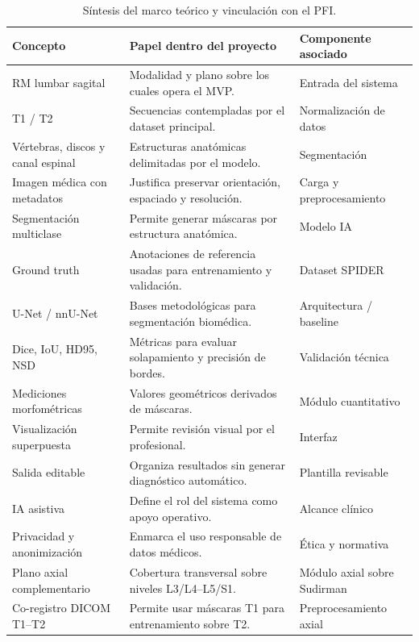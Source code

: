 \begin{table}[htbp]
\centering
\caption{Síntesis del marco teórico y vinculación con el PFI.}
\label{tab:sintesis_marco_teorico_pfi}
\small
\begin{tabularx}{\textwidth}{p{} X p{}}
\hline
\textbf{Concepto} & \textbf{Papel dentro del proyecto} & \textbf{Componente asociado} \\
\hline
RM lumbar sagital & Modalidad y plano sobre los cuales opera el MVP. & Entrada del sistema \\
T1 / T2 & Secuencias contempladas por el dataset principal. & Normalización de datos \\
Vértebras, discos y canal espinal & Estructuras anatómicas delimitadas por el modelo. & Segmentación \\
Imagen médica con metadatos & Justifica preservar orientación, espaciado y resolución. & Carga y preprocesamiento \\
Segmentación multiclase & Permite generar máscaras por estructura anatómica. & Modelo IA \\
Ground truth & Anotaciones de referencia usadas para entrenamiento y validación. & Dataset SPIDER \\
U-Net / nnU-Net & Bases metodológicas para segmentación biomédica. & Arquitectura / baseline \\
Dice, IoU, HD95, NSD & Métricas para evaluar solapamiento y precisión de bordes. & Validación técnica \\
Mediciones morfométricas & Valores geométricos derivados de máscaras. & Módulo cuantitativo \\
Visualización superpuesta & Permite revisión visual por el profesional. & Interfaz \\
Salida editable & Organiza resultados sin generar diagnóstico automático. & Plantilla revisable \\
IA asistiva & Define el rol del sistema como apoyo operativo. & Alcance clínico \\
Privacidad y anonimización & Enmarca el uso responsable de datos médicos. & Ética y normativa \\
Plano axial complementario & Cobertura transversal sobre niveles L3/L4--L5/S1. & Módulo axial sobre Sudirman \\
Co-registro DICOM T1--T2 & Permite usar máscaras T1 para entrenamiento sobre T2. & Preprocesamiento axial \\
\hline
\end{tabularx}
\end{table}

